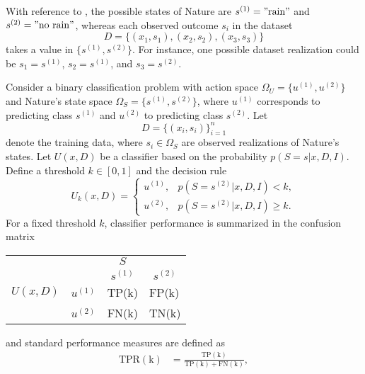 \begin{example}
	With reference to , the possible states of Nature are $s^{(1)} = "\text{rain}"$ and $s^{(2)} = "\text{no rain}"$, whereas each observed outcome $s_i$ in the dataset 
	\begin{equation}
		D = \{(x_1,s_1),(x_2,s_2),(x_3,s_3)\}
	\end{equation}
	takes a value in $\{s^{(1)},s^{(2)}\}$. For instance, one possible dataset realization could be $s_1=s^{(1)}$, $s_2=s^{(1)}$, and $s_3=s^{(2)}$.
\end{example}

\begin{example}
	Consider a binary classification problem with action space $\Omega_U = \{u^{(1)},u^{(2)}\}$ and Nature's state space $\Omega_S = \{s^{(1)}, s^{(2)}\}$, where $u^{(1)}$ corresponds to predicting class $s^{(1)}$ and $u^{(2)}$ to predicting class $s^{(2)}$. Let
	\begin{equation}
		D = \{(x_i,s_i)\}_{i=1}^n
	\end{equation}
	denote the training data, where $s_i \in \Omega_S$ are observed realizations of Nature's states. Let $U(x,D)$ be a classifier based on the probability $p(S = s | x, D, I)$. Define a threshold $k\in[0,1]$ and the decision rule
	\begin{equation}
		U_k(x,D) =
		\begin{cases}
			u^{(1)}, & p(S=s^{(2)} | x, D, I) < k,\\
			u^{(2)}, & p(S=s^{(2)} | x, D, I) \ge k.
		\end{cases}
	\end{equation}
	For a fixed threshold $k$, classifier performance is summarized in the confusion matrix
	\begin{center}
		\begin{tabular}{ c  c  c c}
			&& $S$ &  \\
			&& $s^{(1)}$ & $s^{(2)}$ \\
			\cline{3-4}
			$U(x,D)$ & $u^{(1)}$& \multicolumn{1}{|l}{TP(k)} & \multicolumn{1}{l|}{FP(k)}\\
			& $u^{(2)}$& \multicolumn{1}{|l}{FN(k)} & \multicolumn{1}{l|}{TN(k)}\\
			\cline{3-4}
		\end{tabular}
	\end{center}
	and standard performance measures are defined as
	\begin{align}
		\operatorname{TPR(k)} &= \frac{\operatorname{TP(k)}}{\operatorname{TP(k)} + \operatorname{FN(k)}},\\

\end{align}
\end{example}
